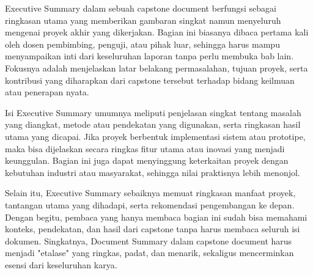 Executive Summary dalam sebuah capstone document berfungsi sebagai ringkasan utama yang memberikan gambaran singkat namun menyeluruh mengenai proyek akhir yang dikerjakan. Bagian ini biasanya dibaca pertama kali oleh dosen pembimbing, penguji, atau pihak luar, sehingga harus mampu menyampaikan inti dari keseluruhan laporan tanpa perlu membuka bab lain. Fokusnya adalah menjelaskan latar belakang permasalahan, tujuan proyek, serta kontribusi yang diharapkan dari capstone tersebut terhadap bidang keilmuan atau penerapan nyata.

Isi Executive Summary umumnya meliputi penjelasan singkat tentang masalah yang diangkat, metode atau pendekatan yang digunakan, serta ringkasan hasil utama yang dicapai. Jika proyek berbentuk implementasi sistem atau prototipe, maka bisa dijelaskan secara ringkas fitur utama atau inovasi yang menjadi keunggulan. Bagian ini juga dapat menyinggung keterkaitan proyek dengan kebutuhan industri atau masyarakat, sehingga nilai praktisnya lebih menonjol.

Selain itu, Executive Summary sebaiknya memuat ringkasan manfaat proyek, tantangan utama yang dihadapi, serta rekomendasi pengembangan ke depan. Dengan begitu, pembaca yang hanya membaca bagian ini sudah bisa memahami konteks, pendekatan, dan hasil dari capstone tanpa harus membaca seluruh isi dokumen. Singkatnya, Document Summary dalam capstone document harus menjadi "etalase" yang ringkas, padat, dan menarik, sekaligus mencerminkan esensi dari keseluruhan karya.